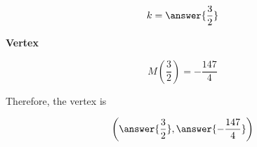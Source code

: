 \documentclass{ximera}
\begin{document}
\begin{exercise}
\begin{question}
\[
k = \answer{\frac{3}{2}}
\]

\end{question}







\begin{question}  \textbf{\textcolor{blue!55!black}{Vertex}}


\[
M\left( \frac{3}{2} \right) = -\frac{147}{4}
\]


Therefore, the vertex is

 \[  
 \left( \answer{\frac{3}{2}}, \answer{-\frac{147}{4}} \right)
\]


\end{question}











\end{exercise}
\end{document}
